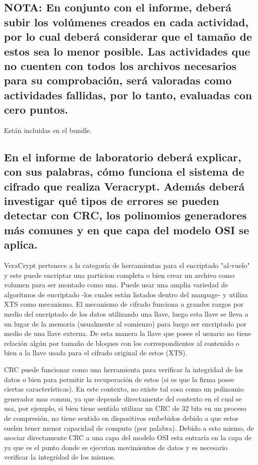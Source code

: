 \documentclass[11pt]{utalcaDoc}
\begin{document}
\subsection{NOTA: En conjunto con el informe, deberá subir los volúmenes creados en cada actividad, por lo cual deberá considerar que el tamaño de estos sea lo menor posible. Las actividades que no cuenten con todos los archivos necesarios para su comprobación, será valoradas como actividades
	fallidas, por lo tanto, evaluadas con cero puntos.}
Están incluidas en el bundle.

\subsection{En el informe de laboratorio deberá explicar, con sus palabras, cómo funciona el sistema de cifrado que realiza Veracrypt. Además deberá investigar qué tipos de errores se pueden detectar con CRC, los polinomios generadores más comunes y en que capa del modelo OSI se aplica.}

VeraCrypt pertenece a la categoría de herramientas para el encriptado "al-vuelo" y este puede encriptar una particion completa o bien crear un archivo como volumen para ser montado como una. Puede usar una amplia variedad de algoritmos de encriptado -los cuales están listados dentro del manpage- y utiliza XTS como mecanismo. El mecanismo de cifrado funciona a grandes razgos por medio del encriptado de los datos utilizando una llave, luego esta llave se lleva a un lugar de la memoria (usualmente al comienzo) para luego ser encriptado por medio de una llave externa. De esta manera la llave que posee el usuario no tiene relación algún por tamaño de bloques con los correspondientes al contenido o bien a la llave usada para el cifrado original de estos (XTS).\cite{REF:veracrypt}

CRC puede funcionar como una herramienta para verificar la integridad de los datos o bien para permitir la recuperación de estos (si es que la firma posee ciertas características).\cite{REF:crc} En este contexto, no existe tal cosa como un polinomio generador mas comun, ya que depende directamente del contexto en el cual se usa, por ejemplo, si bien tiene sentido utilizar un CRC de 32 bits en un proceso de compresión, no tiene sentido en dispositivos embebidos debido a que estos suelen tener menor capacidad de computo (por palabra)\cite{REF:mellon}. Debido a esto mismo, de asociar directamente CRC a una capa del modelo OSI esta entraría en la capa de   ya que es el punto donde se ejecutan movimientos de datos y es necesario verificar la integridad de los mismos.
\end{document}
